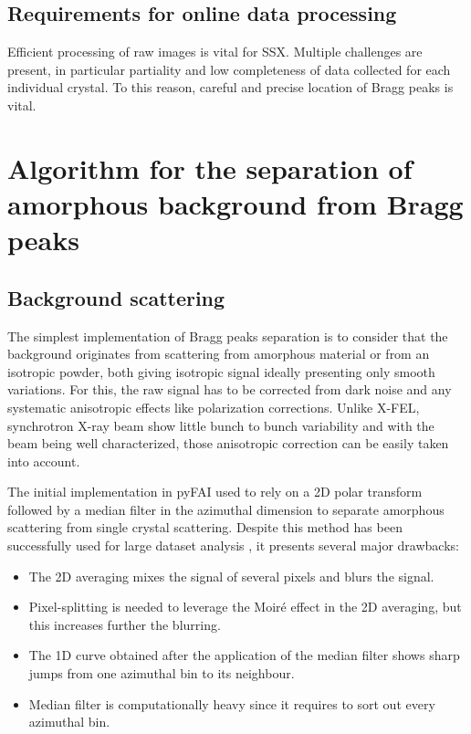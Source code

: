\documentclass[a4paper,12pt,oneside]{article}              %
\begin{document}
\subsection{Requirements for online data processing}
Efficient processing of raw images is vital for SSX.
Multiple challenges are present, in particular partiality and low completeness of data collected for each individual crystal.
To this reason, careful and precise location of Bragg peaks is vital.

\section{Algorithm for the separation of amorphous background from Bragg peaks}
\subsection{Background scattering}

The simplest implementation of Bragg peaks separation is to consider that the background originates from scattering from amorphous material or from an isotropic powder, both giving isotropic signal ideally presenting only smooth variations.
For this, the raw signal has to be corrected from dark noise and any systematic anisotropic effects like polarization corrections.
Unlike X-FEL, synchrotron X-ray beam show little bunch to bunch variability and with the beam being well characterized, those anisotropic correction can be easily taken into account.

The initial implementation in pyFAI \cite{pdj2013} used to rely on a 2D polar transform followed by a median filter in the azimuthal dimension 
to separate amorphous scattering from single crystal scattering.
Despite this method has been successfully used for large dataset analysis \cite{brocades}, it presents several major drawbacks:
\begin{itemize}
\item The 2D averaging mixes the signal of several pixels and blurs the signal. 
\item Pixel-splitting is needed to leverage the Moiré effect in the 2D averaging, but this increases further the blurring. 
\item The 1D curve obtained after the application of the median filter shows sharp jumps from one azimuthal bin to its neighbour.
\item Median filter is computationally heavy since it requires to sort out every azimuthal bin.
\end{itemize}
\end{document}
